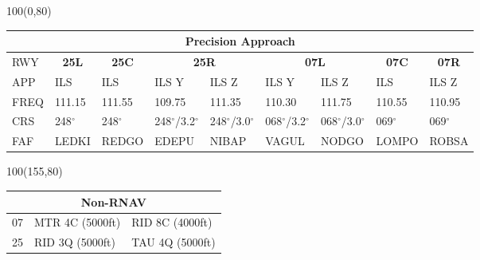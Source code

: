 \documentclass[10pt,landscape,a4paper]{article}
\begin{document}
\begin{textblock}{100}(0,80)
\begin{table}[]
\begin{tabular}{|l|l|l|l|l|l|l|l|l|}
\multicolumn{9}{c}{\textbf{Precision Approach}}                                                                                                                                                                            \\ \hline
RWY  & \multicolumn{1}{c|}{\textbf{25L}} & \multicolumn{1}{c|}{\textbf{25C}} & \multicolumn{2}{c|}{\textbf{25R}} & \multicolumn{2}{c|}{\textbf{07L}} & \multicolumn{1}{c|}{\textbf{07C}} & \multicolumn{1}{c|}{\textbf{07R}} \\ \hline
APP  & ILS                               & ILS                               & ILS Y           & ILS Z           & ILS Y           & ILS Z           & ILS                               & ILS Z                             \\
FREQ & 111.15                            & 111.55                            & 109.75          & 111.35          & 110.30          & 111.75          & 110.55                            & 110.95                            \\
CRS  & 248$^\circ$                              & 248$^\circ$                              & 248$^\circ$/3.2$^\circ$       & 248$^\circ$/3.0$^\circ$       & 068$^\circ$/3.2$^\circ$       & 068$^\circ$/3.0$^\circ$       & 069$^\circ$                              & 069$^\circ$                              \\
FAF  & LEDKI                             & REDGO                             & EDEPU           & NIBAP           & VAGUL           & NODGO           & LOMPO                             & ROBSA                             \\ \hline
\end{tabular}
\end{table}
\end{textblock}



\begin{textblock}{100}(155,80)
\footnotesize
\begin{table}[]
\begin{tabular}{|l|l|l|}
\multicolumn{3}{c}{\textbf{Non-RNAV}} \\ \hline
07  & MTR 4C (5000ft)    & RID 8C (4000ft)   \\ \hline
25  & RID 3Q (5000ft)    & TAU 4Q (5000ft)   \\ \hline
\end{tabular}
\end{table}
\end{textblock}
\end{document}
